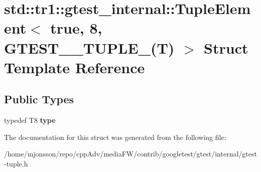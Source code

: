 \hypertarget{structstd_1_1tr1_1_1gtest__internal_1_1TupleElement_3_01true_00_018_00_01GTEST__10__TUPLE___07T_08_01_4}{}\section{std\+:\+:tr1\+:\+:gtest\+\_\+internal\+:\+:Tuple\+Element$<$ true, 8, G\+T\+E\+S\+T\+\_\+\_\+\+T\+U\+P\+L\+E\+\_\+(T) $>$ Struct Template Reference}
\label{structstd_1_1tr1_1_1gtest__internal_1_1TupleElement_3_01true_00_018_00_01GTEST__10__TUPLE___07T_08_01_4}
\subsection*{Public Types}
\begin{DoxyCompactItemize}
\item 
\mbox{\label{structstd_1_1tr1_1_1gtest__internal_1_1TupleElement_3_01true_00_018_00_01GTEST__10__TUPLE___07T_08_01_4_a7b4d456a790291b651b4179650754587}} 
typedef T8 {\bfseries type}
\end{DoxyCompactItemize}


The documentation for this struct was generated from the following file\+:\begin{DoxyCompactItemize}
\item 
/home/mjonsson/repo/cpp\+Adv/media\+F\+W/contrib/googletest/gtest/internal/gtest-\/tuple.\+h\end{DoxyCompactItemize}
